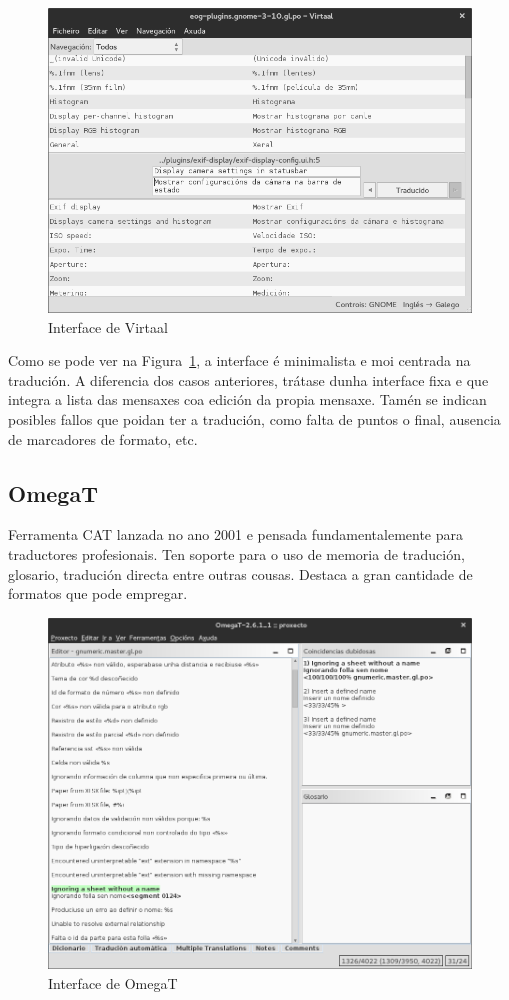 \begin{figure}[h]
    \centering
    \includegraphics[width=\textwidth]{img/captura_virtaal.png}
    \caption{Interface de Virtaal}
    \label{fig:virtaal}
\end{figure}

Como se pode ver na Figura~\ref{fig:virtaal}, a interface é minimalista e moi centrada na tradución. A diferencia dos casos anteriores, trátase dunha interface fixa e que integra a lista das mensaxes coa edición da propia mensaxe. Tamén se indican posibles fallos que poidan ter a tradución, como falta de puntos o final, ausencia de marcadores de formato, etc.

\subsection{OmegaT}
Ferramenta CAT lanzada no ano 2001 e pensada fundamentalemente para traductores profesionais. Ten soporte para o uso de memoria de tradución, glosario, tradución directa entre outras cousas. Destaca a gran cantidade de formatos que pode empregar.

\begin{figure}[h]
    \centering
    \includegraphics[width=\textwidth]{img/captura_omegat.png}
    \caption{Interface de OmegaT}
    \label{fig:omegat}
\end{figure}

